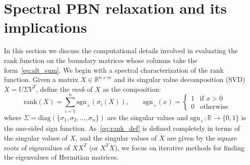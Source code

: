 \documentclass[10pt]{article}
\numberwithin{equation}{section}
\newcommand{\+}{%
	\raisebox{0.18ex}{\scaleobj{0.55}{+}}
}
\theoremstyle{definition}
\begin{document}
\section{Spectral PBN relaxation and its implications}\label{sec:methodology}
In this section we discuss the computational details involved in evaluating the rank function on the boundary matrices whose columns take the form~\eqref{eq:alt_sum}. We begin with a spectral characterization of the rank function. Given a matrix $X \in \mathbb{R}^{n \times m}$ and its singular value decomposition (SVD) $X = U \Sigma V^T$, define the \emph{rank} of $X$ as the composition:
\begin{equation}\label{eq:rank_def}
	\mathrm{rank}(X) = \sum\limits_{i=1}^{n} \mathrm{sgn}_+(\sigma_i(X)), \quad \quad \mathrm{sgn}_{+}(x) = \begin{cases}
		1 & \text{if } x > 0 \\
		0 & \text{otherwise}
	\end{cases}
\end{equation}
where $\Sigma = \mathrm{diag}(\{\sigma_1, \sigma_2, \dots, \sigma_n \})$ are the singular values  and $\mathrm{sgn}_+: \mathbb{R} \to \{0, 1\}$ is the one-sided sign function. As~\eqref{eq:rank_def} is defined completely in terms of the singular values of $X$, and the singular values of $X$ are given by the square roots of eigenvalues of $X X^T$ (or $X^T X$), we focus on iterative methods for finding the eigenvalues of Hermitian matrices. 

\end{document}

